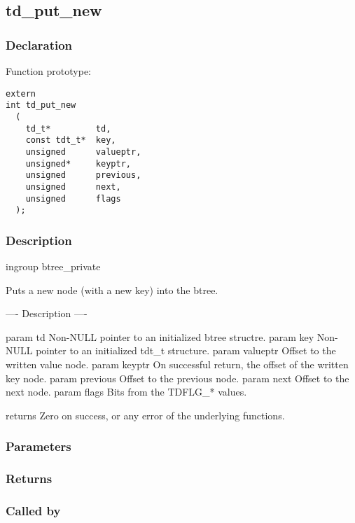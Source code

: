 
\newpage
\subsection{td\_put\_new}
\subsubsection{Declaration} Function prototype:

\begin{verbatim}
extern
int td_put_new
  (
    td_t*         td,
    const tdt_t*  key,
    unsigned      valueptr,
    unsigned*     keyptr,
    unsigned      previous,
    unsigned      next,
    unsigned      flags
  );
\end{verbatim}

\subsubsection{Description}


 ingroup btree\_private

 Puts a new node (with a new key) into the btree.

 ---- Description ----

 param td Non-NULL pointer to an initialized btree structre.
 param key Non-NULL pointer to an initialized tdt\_t structure.
 param valueptr Offset to the written value node.
 param keyptr On successful return, the offset of the written key node.
 param previous Offset to the previous node.
 param next Offset to the next node.
 param flags Bits from the TDFLG\_* values.

 returns Zero on success, or any error of the underlying functions.
 

\subsubsection{Parameters}
\subsubsection{Returns}
\subsubsection{Called by}
